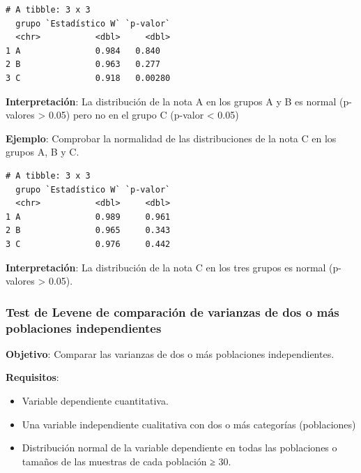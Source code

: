 \documentclass[
  a4paper,
]{scrreport}
\newenvironment{Shaded}{\begin{snugshade}}{\end{snugshade}}
\newcommand{\AttributeTok}[1]{\textcolor[rgb]{0.40,0.45,0.13}{#1}}
\newcommand{\FunctionTok}[1]{\textcolor[rgb]{0.28,0.35,0.67}{#1}}
\newcommand{\NormalTok}[1]{\textcolor[rgb]{0.00,0.23,0.31}{#1}}
\newcommand{\OtherTok}[1]{\textcolor[rgb]{0.00,0.23,0.31}{#1}}
\newcommand{\SpecialCharTok}[1]{\textcolor[rgb]{0.37,0.37,0.37}{#1}}
\newcommand{\StringTok}[1]{\textcolor[rgb]{0.13,0.47,0.30}{#1}}
\providecommand{\tightlist}{%
  \setlength{\itemsep}{0pt}\setlength{\parskip}{0pt}}\usepackage{longtable,booktabs,array}
\theoremstyle{definition}
\theoremstyle{definition}
\theoremstyle{remark}
\begin{document}
\begin{verbatim}
# A tibble: 3 x 3
  grupo `Estadístico W` `p-valor`
  <chr>           <dbl>     <dbl>
1 A               0.984   0.840  
2 B               0.963   0.277  
3 C               0.918   0.00280
\end{verbatim}

\textbf{Interpretación}: La distribución de la nota A en los grupos A y
B es normal (p-valores \textgreater{} 0.05) pero no en el grupo C
(p-valor \textless{} 0.05)

\textbf{Ejemplo}: Comprobar la normalidad de las distribuciones de la
nota C en los grupos A, B y C.

\begin{Shaded}
\end{Shaded}

\begin{verbatim}
# A tibble: 3 x 3
  grupo `Estadístico W` `p-valor`
  <chr>           <dbl>     <dbl>
1 A               0.989     0.961
2 B               0.965     0.343
3 C               0.976     0.442
\end{verbatim}

\textbf{Interpretación}: La distribución de la nota C en los tres grupos
es normal (p-valores \textgreater{} 0.05).

\subsubsection{Test de Levene de comparación de varianzas de dos o más
poblaciones
independientes}\label{test-de-levene-de-comparaciuxf3n-de-varianzas-de-dos-o-muxe1s-poblaciones-independientes}

\textbf{Objetivo}: Comparar las varianzas de dos o más poblaciones
independientes.

\textbf{Requisitos}:

\begin{itemize}
\tightlist
\item
  Variable dependiente cuantitativa.
\item
  Una variable independiente cualitativa con dos o más categorías
  (poblaciones)
\item
  Distribución normal de la variable dependiente en todas las
  poblaciones o tamaños de las muestras de cada población ≥ 30.
\end{itemize}
\end{document}
